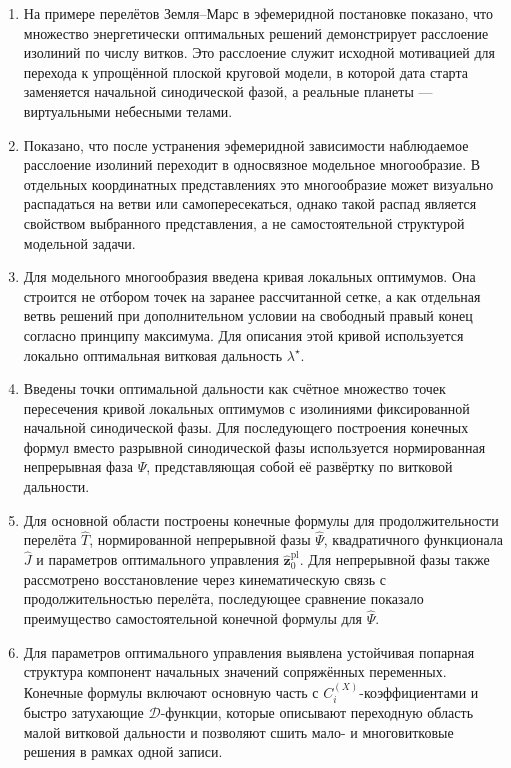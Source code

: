 \begin{enumerate}
	\item
На примере перелётов Земля--Марс в эфемеридной постановке показано, что множество энергетически оптимальных решений демонстрирует расслоение изолиний по числу витков. Это расслоение служит исходной мотивацией для перехода к упрощённой плоской круговой модели, в которой дата старта заменяется начальной синодической фазой, а реальные планеты --- виртуальными небесными телами.
	
	\item
Показано, что после устранения эфемеридной зависимости наблюдаемое расслоение изолиний переходит в односвязное модельное многообразие. В отдельных координатных представлениях это многообразие может визуально распадаться на ветви или самопересекаться, однако такой распад является свойством выбранного представления, а не самостоятельной структурой модельной задачи.
	
	\item Для модельного многообразия введена кривая локальных оптимумов. Она строится не отбором точек на заранее рассчитанной сетке, а как отдельная ветвь решений при дополнительном условии на свободный правый конец согласно принципу максимума. Для описания этой кривой используется локально оптимальная витковая дальность $\lambda^\star$.
	
	\item Введены точки оптимальной дальности как счётное множество точек пересечения кривой локальных оптимумов с изолиниями фиксированной начальной синодической фазы. Для последующего построения конечных формул вместо разрывной синодической фазы используется нормированная непрерывная фаза $\Psi$, представляющая собой её развёртку по витковой дальности.
	
	\item Для основной области построены конечные формулы для продолжительности перелёта $\widehat{T}$, нормированной непрерывной фазы $\widehat{\Psi}$, квадратичного функционала $\widehat{J}$ и параметров оптимального управления $\widehat{\mathbf z}^{\mathrm{pl}}_0$. Для непрерывной фазы также рассмотрено восстановление через кинематическую связь с продолжительностью перелёта, последующее сравнение показало преимущество самостоятельной конечной формулы для $\widehat{\Psi}$.
	
	\item Для параметров оптимального управления выявлена устойчивая попарная структура компонент начальных значений сопряжённых переменных. Конечные формулы включают основную часть с $C_i^{(X)}$-коэффициентами и быстро затухающие $\mathcal D$-функции, которые описывают переходную область малой витковой дальности и позволяют сшить мало- и многовитковые решения в рамках одной записи.
	

\end{enumerate}
